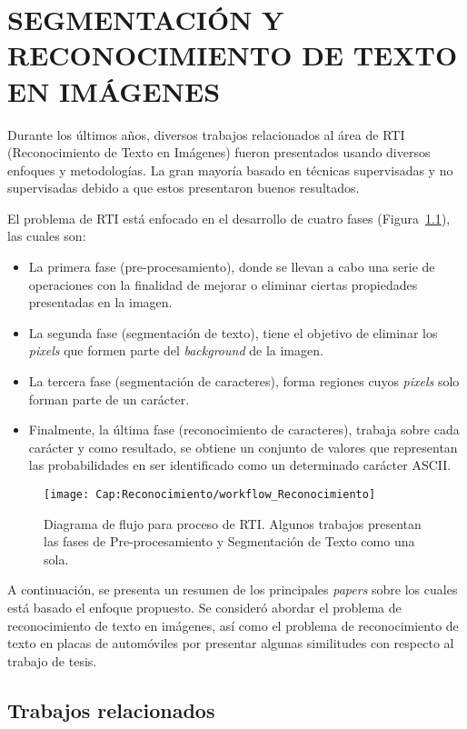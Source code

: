 \chapter{SEGMENTACIÓN Y RECONOCIMIENTO DE TEXTO EN IMÁGENES}
\label{cap-reconocimiento}
\setcounter{secnumdepth}{0}
Durante los últimos años, diversos trabajos relacionados al área de RTI
(Reconocimiento de Texto en Imágenes) fueron presentados usando diversos
enfoques y metodologías. La gran mayoría basado en técnicas supervisadas y no
supervisadas debido a que estos presentaron buenos resultados.%

El problema de RTI está enfocado en el desarrollo de cuatro fases
(Figura~\ref{fig:cap-reconocimiento:workflowtodo}), las cuales son:
\begin{itemize}
	\item La primera fase (pre-procesamiento), donde se llevan a cabo una serie de
operaciones con la finalidad de mejorar o eliminar ciertas propiedades
presentadas en la imagen.
	\item La segunda fase (segmentación de texto), tiene el objetivo de eliminar
los \textit{pixels} que formen parte del \textit{background} de la imagen.
	\item La tercera fase (segmentación de caracteres), forma regiones cuyos
\textit{pixels} solo forman parte de un carácter.
	\item Finalmente, la última fase (reconocimiento de caracteres), trabaja sobre
cada carácter y como resultado, se obtiene un conjunto de valores que
representan las probabilidades en ser identificado como un determinado carácter
ASCII.
\end{itemize}

\begin{figure}[h!]
	\centering
	\texttt{[image: Cap:Reconocimiento/workflow\_Reconocimiento]}
	\caption{Diagrama de flujo para proceso de RTI. Algunos trabajos presentan las fases
	de Pre-procesamiento y Segmentación de Texto como una sola.}
	\label{fig:cap-reconocimiento:workflowtodo}
\end{figure}

A continuación, se presenta un resumen de los principales \textit{papers} sobre 
los cuales está basado el enfoque propuesto. Se consideró abordar el problema 
de reconocimiento de texto en imágenes, así como el problema de reconocimiento 
de texto en placas de automóviles por presentar algunas similitudes con respecto
al trabajo de tesis.

\setcounter{secnumdepth}{3}
\section{Trabajos relacionados}
